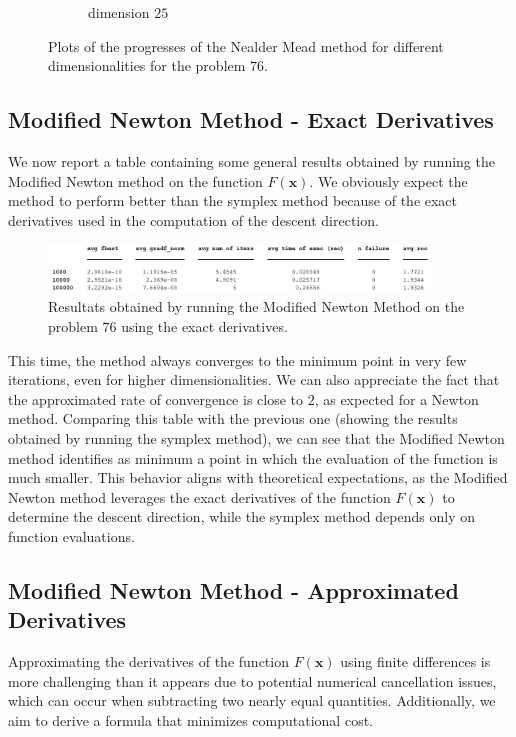 \begin{figure}[htbp]
\begin{subfigure}[t]{0.35\textwidth}
        \caption{dimension $25$}
        \label{fig:R8}
    \end{subfigure}
    \caption{ \small Plots of the progresses of the Nealder Mead method for different dimensionalities for the problem $76$.}
    \label{fig:overall}
\end{figure}


\medskip
\subsection*{Modified Newton Method - Exact Derivatives}
We now report a table containing some general results obtained by running the Modified Newton method on the function $F(\mathbf{x})$.
We obviously expect the method to perform better than the symplex method because of the exact derivatives used in the computation of the descent direction.

\begin{figure}[htbp]
    \centering
    \includegraphics[width = 0.9\textwidth]{img/pb76_table_MN.png}
    \caption{Resultats obtained by running the Modified Newton Method on the problem $76$ using the exact derivatives.}
\end{figure}

This time, the method always converges to the minimum point in very few iterations, even for higher dimensionalities. 
We can also appreciate the fact that the approximated rate of convergence is close to $2$, as expected for a Newton method.
Comparing this table with the previous one (showing the results obtained by running the symplex method), we can see that the Modified Newton method identifies as minimum a point in which the evaluation of the function is much smaller. 
This behavior aligns with theoretical expectations, as the Modified Newton method leverages the exact derivatives of the function $F(\mathbf{x})$ to determine the descent direction, while the symplex method depends only on function evaluations.

\medskip
\subsection*{Modified Newton Method - Approximated Derivatives}
Approximating the derivatives of the function $F(\mathbf{x})$ using finite differences is more challenging than it appears due to potential numerical cancellation issues, which can occur when subtracting two nearly equal quantities. Additionally, we aim to derive a formula that minimizes computational cost.

